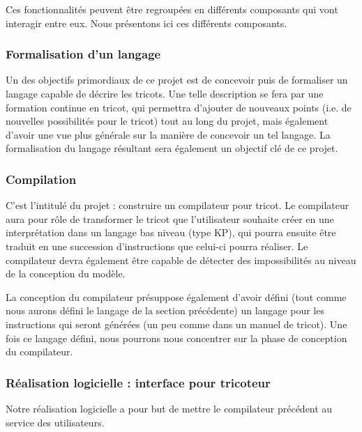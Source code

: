 \documentclass{article}
\begin{document}
Ces fonctionnalités peuvent être regroupées en différents composants qui vont interagir entre eux. Nous présentons ici ces différents 
composants.

\subsubsection{Formalisation d'un langage}


Un des objectifs primordiaux de ce projet est de concevoir puis de formaliser un langage capable de décrire les tricots.
Une telle description se fera par une formation continue en tricot, qui permettra d'ajouter de nouveaux points (i.e. de nouvelles
possibilités pour le tricot) tout au long du projet, mais également d'avoir une vue plus générale sur la manière de concevoir un tel
langage. La formalisation du langage résultant sera également un objectif clé de ce projet.

\subsubsection{Compilation}

C'est l'intitulé du projet : construire un compilateur pour tricot. Le compilateur aura pour rôle de transformer le tricot que
l'utilisateur souhaite créer en une interprétation dans un langage bas niveau (type KP), qui pourra ensuite être traduit en une succession
d'instructions que celui-ci pourra réaliser.
Le compilateur devra également être capable de détecter des impossibilités au niveau de la conception du modèle.

La conception du compilateur présuppose également d'avoir défini (tout comme nous aurons défini le langage de la section précédente) un
langage pour les instructions qui seront générées (un peu comme dans un manuel de tricot).
Une fois ce langage défini, nous pourrons nous concentrer sur la phase de conception du compilateur.

\subsubsection{Réalisation logicielle : interface pour tricoteur}

Notre réalisation logicielle a pour but de mettre le compilateur précédent au service des utilisateurs.
\end{document}
